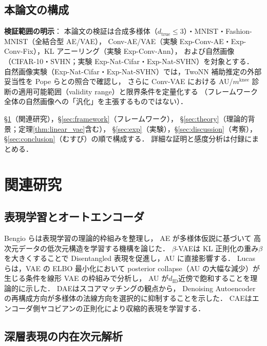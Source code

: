 \documentclass[11pt,a4paper]{jsarticle}
\newcommand{\mknee}{m^{\mathrm{knee}}}
\begin{document}
\subsection{本論文の構成}\label{sec:intro_structure}

\textbf{検証範囲の明示}：
本論文の検証は合成多様体（$d_{\mathrm{true}} \leq 3$）・MNIST・Fashion-MNIST（全結合型 AE/VAE），
Conv-AE/VAE（実験 Exp-Conv-AE・Exp-Conv-Fix），KL アニーリング（実験 Exp-Conv-Ann），
および自然画像（CIFAR-10・SVHN；実験 Exp-Nat-Cifar・Exp-Nat-SVHN）を対象とする．
自然画像実験（Exp-Nat-Cifar・Exp-Nat-SVHN）では，TwoNN 補助推定の外部妥当性を
Pope ら\cite{pope2021intrinsic}との照合で確認し，
さらに Conv-VAE における AU/$\mknee$ 診断の適用可能範囲（validity range）と限界条件を定量化する
（フレームワーク全体の自然画像への「汎化」を主張するものではない）．

§\ref{sec:related}（関連研究），§\ref{sec:framework}（フレームワーク），
§\ref{sec:theory}（理論的背景；定理\ref{thm:linear_vae}含む），
§\ref{sec:exp}（実験），§\ref{sec:discussion}（考察），§\ref{sec:conclusion}（むすび）の順で構成する．
詳細な証明と感度分析は付録にまとめる．

\section{関連研究}\label{sec:related}

\subsection{表現学習とオートエンコーダ}\label{sec:related_ae}

Bengio ら\cite{bengio2013representation}は表現学習の理論的枠組みを整理し，
AE が多様体仮説\cite{fefferman2016manifold}に基づいて
高次元データの低次元構造を学習する機構を論じた．
$\beta$-VAE\cite{higgins2017betavae}は KL 正則化の重み$\beta$を大きくすることで
Disentangled 表現を促進し，AU に直接影響する．
Lucas ら\cite{lucas2019elbo}は，VAE の ELBO 最小化において
posterior collapse（AU の大幅な減少）が生じる条件を線形 VAE の枠組みで分析し，
AU が$d_{\mathrm{ID}}$近傍で飽和することを理論的に示した．
DAE\cite{alain2014dae}はスコアマッチングの観点から，
Denoising Autoencoder の再構成方向が多様体の法線方向を選択的に抑制することを示した．
CAE\cite{rifai2011cae}はエンコーダ側ヤコビアンの正則化により収縮的表現を学習する．

\subsection{深層表現の内在次元解析}\label{sec:related_id}
\end{document}

